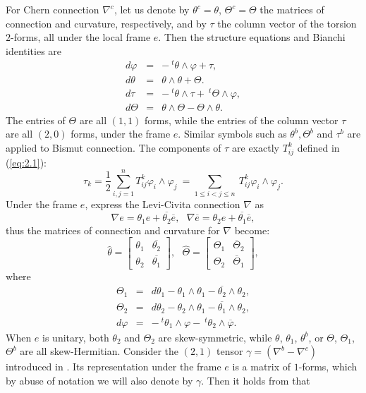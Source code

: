 \documentclass{amsart}
\numberwithin{equation}{section}
\theoremstyle{definition}
\renewcommand{\1}{\mathds{1}}
\renewcommand{\>}{\rightarrow}
\begin{document}
For Chern connection $\nabla^c$, let us denote by $\theta^c=\theta$,  $\Theta^c=\Theta$ the matrices of connection and
curvature, respectively, and by $\tau$ the column vector of the
torsion $2$-forms, all under the local frame $e$. Then the structure
equations and Bianchi identities are
\begin{eqnarray*}
d \varphi & = & - \ ^t\!\theta \wedge \varphi + \tau,  \label{formula 1}\\
d  \theta & = & \theta \wedge \theta + \Theta. \\
d \tau & = & - \ ^t\!\theta \wedge \tau + \ ^t\!\Theta \wedge \varphi, \label{formula 3} \\
d  \Theta & = & \theta \wedge \Theta - \Theta \wedge \theta.
\end{eqnarray*}
The entries of $\Theta$ are all $(1,1)$ forms, while the entries of the column vector $\tau $ are all $(2,0)$ forms, under the frame $e$.
Similar symbols such as $\theta^b,\Theta^b$ and $\tau^b$ are applied to Bismut connection.
The components of $\tau$ are exactly $T_{ij}^k$ defined in (\ref{eq:2.1}):
\[ \tau_k =\frac{1}{2}  \sum_{i,j=1}^n T_{ij}^k \varphi_i\wedge \varphi_j \ = \sum_{1\leq i<j\leq n}  \ T_{ij}^k \varphi_i\wedge \varphi_j.\]
Under the frame $e$, express the Levi-Civita connection $\nabla$ as
$$ \nabla e = \theta_1 e + \overline{\theta_2 }\overline{e} ,
\ \ \ \nabla \overline{e} = \theta_2 e + \overline{\theta_1
}\overline{e} ,$$
thus the matrices of connection and curvature for $\nabla $ become:
$$ \hat{\theta } = \left[ \begin{array}{ll} \theta_1 & \overline{\theta_2 } \\ \theta_2 & \overline{\theta_1 }  \end{array} \right] , \ \  \  \hat{\Theta } = \left[ \begin{array}{ll} \Theta_1 & \overline{\Theta}_2  \\ \Theta_2 & \overline{\Theta}_1   \end{array} \right], $$
 where
\begin{eqnarray*}
\Theta_1 & = & d\theta_1 -\theta_1 \wedge \theta_1 -\overline{\theta_2} \wedge \theta_2, \\
\Theta_2 & = & d\theta_2 - \theta_2 \wedge \theta_1 - \overline{\theta_1 } \wedge \theta_2,  \label{formula 7}\\
d\varphi & = & - \ ^t\! \theta_1 \wedge \varphi - \ ^t\! \theta_2
\wedge \overline{\varphi } .
\end{eqnarray*}
When $e$ is unitary, both $\theta_2 $ and $\Theta_2$ are skew-symmetric, while $\theta$, $\theta_1$, $\theta^b$, or $\Theta$, $\Theta_1$, $\Theta^b$ are all skew-Hermitian. Consider the $(2,1)$ tensor $\gamma = (\nabla^b -\nabla^c)$ introduced in \cite{YZ18Cur}. Its representation under the frame $e$ is a matrix of $1$-forms, which by abuse of notation we will also denote by $\gamma$. Then it holds from \cite[Lemma 2]{WYZ} that
\end{document}
